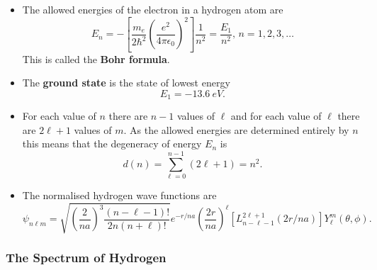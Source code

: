 \documentclass{article}
\begin{document}
\begin{itemize}
  \item The allowed energies of the electron in a hydrogen atom are \[E_n = -\left[ \frac{m_e}{2 \hbar^2} \left( \frac{e^2}{4 \pi \epsilon_0} \right)^2 \right] \frac{1}{n^2} = \frac{E_1}{n^2}, \,n = 1, 2, 3, \ldots\] This is called the \textbf{Bohr formula}.

  \item The \textbf{ground state} is the state of lowest energy \[E_1 = \qty{-13.6}{eV}.\]

  \item For each value of $n$ there are $n - 1$ values of $\ell$ and for each value of $\ell$ there are $2 \ell + 1$ values of $m$. As the allowed energies are determined entirely by $n$ this means that the degeneracy of energy $E_n$ is \[d(n) = \sum_{\ell = 0}^{n - 1} (2 \ell + 1) = n^2.\]
  
  \item The normalised hydrogen wave functions are \[\psi_{n \ell m} = \sqrt{\left( \frac{2}{n a} \right)^3 \frac{(n - \ell - 1)!}{2 n (n + \ell)!}} e^{-r / n a} \left( \frac{2 r}{n a} \right)^\ell \left[ L_{n - \ell - 1}^{2 \ell + 1} (2 r / n a) \right] Y_\ell^m(\theta, \phi).\]
\end{itemize}

\subsubsection{The Spectrum of Hydrogen}
\end{document}

